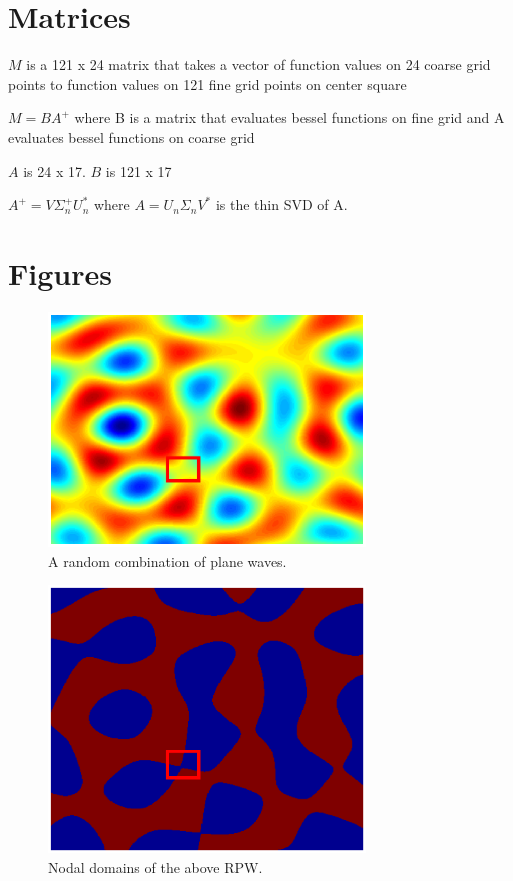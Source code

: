\documentclass{article}
\begin{document}
\section*{Matrices}
$M$ is a 121 x 24 matrix that takes a vector of function values on 24 coarse grid points to function values on 121 fine grid points on center square

$M = BA^{+}$ where B is a matrix that evaluates bessel functions on fine grid and A evaluates bessel functions on coarse grid 

$A$ is 24 x 17.
$B$ is 121 x 17

$A^{+} = V \Sigma_{n}^{+} U_{n}^{*}$ where $A = U_{n} \Sigma_{n} V^{*}$ is the thin SVD of A.


\section*{Figures}

\begin{figure}[h]
  \begin{center}
    \includegraphics[width=0.75\textwidth]{figures/interpolation/high_res_rpw_with_rect.eps}
    \caption{A random combination of plane waves.}
  \end{center}
\end{figure}

\begin{figure}[h]
  \begin{center}
    \includegraphics[width=0.75\textwidth]{figures/interpolation/high_res_domains_with_rect.eps}
    \caption{Nodal domains of the above RPW.}
  \end{center}
\end{figure}
\end{document}
